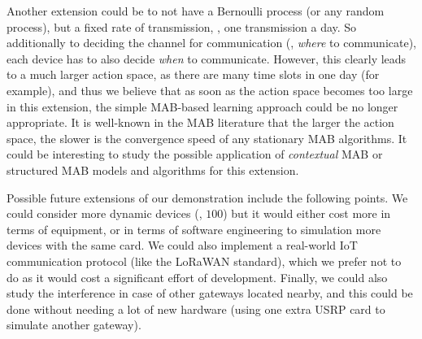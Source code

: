 Another extension could be to not have a Bernoulli process (or any random process), but a fixed rate of transmission, \eg, one transmission a day.
So additionally to deciding the channel for communication (\ie, \emph{where} to communicate), each device has to also decide \emph{when} to communicate.
However, this clearly leads to a much larger action space, as there are many time slots in one day (for example), and thus we believe that as soon as the action space becomes too large in this extension, the simple MAB-based learning approach could be no longer appropriate.
It is well-known in the MAB literature that the larger the action space, the slower is the convergence speed of any stationary MAB algorithms.
It could be interesting to study the possible application of \emph{contextual} MAB \cite{Li10,Luo18} or structured MAB \cite{Combes17} models and algorithms for this extension.



Possible future extensions of our demonstration include the following points.
We could consider more dynamic devices (\eg, $100$) but it would either cost more in terms of equipment, or in terms of software engineering to simulation more devices with the same card.
We could also implement a real-world IoT communication protocol (like the LoRaWAN standard), which we prefer not to do as it would cost a significant effort of development.
Finally, we could also study the interference in case of other gateways located nearby, and this could be done without needing a lot of new hardware (using one extra USRP card to simulate another gateway).
%



